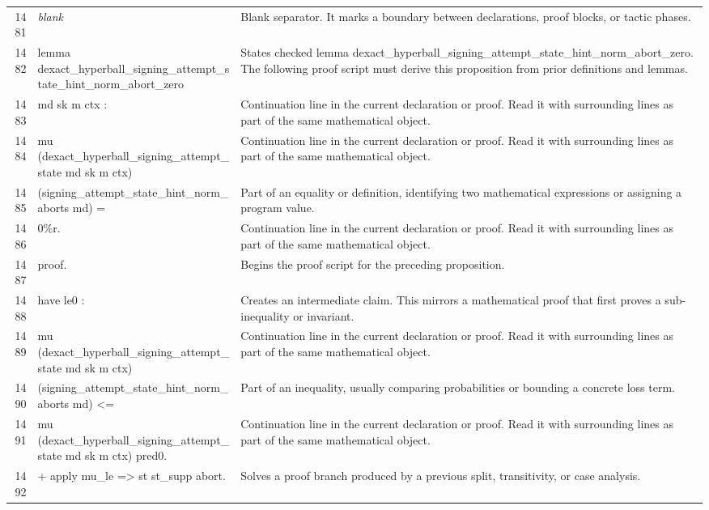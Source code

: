 \documentclass[10pt]{article}
\begin{document}
\begin{longtable}{r L{0.53\textwidth} L{0.37\textwidth}}
1481 & {\ttfamily\scriptsize \emph{blank}} & Blank separator.  It marks a boundary between declarations, proof blocks, or tactic phases. \\
1482 & {\ttfamily\scriptsize lemma dexact\_hyperball\_signing\_attempt\_state\_hint\_norm\_abort\_zero} & States checked lemma dexact\_hyperball\_signing\_attempt\_state\_hint\_norm\_abort\_zero.  The following proof script must derive this proposition from prior definitions and lemmas. \\
1483 & {\ttfamily\scriptsize   md sk m ctx :} & Continuation line in the current declaration or proof.  Read it with surrounding lines as part of the same mathematical object. \\
1484 & {\ttfamily\scriptsize   mu (dexact\_hyperball\_signing\_attempt\_state md sk m ctx)} & Continuation line in the current declaration or proof.  Read it with surrounding lines as part of the same mathematical object. \\
1485 & {\ttfamily\scriptsize     (signing\_attempt\_state\_hint\_norm\_aborts md) =} & Part of an equality or definition, identifying two mathematical expressions or assigning a program value. \\
1486 & {\ttfamily\scriptsize   0\%r.} & Continuation line in the current declaration or proof.  Read it with surrounding lines as part of the same mathematical object. \\
1487 & {\ttfamily\scriptsize proof.} & Begins the proof script for the preceding proposition. \\
1488 & {\ttfamily\scriptsize have le0 :} & Creates an intermediate claim.  This mirrors a mathematical proof that first proves a sub-inequality or invariant. \\
1489 & {\ttfamily\scriptsize   mu (dexact\_hyperball\_signing\_attempt\_state md sk m ctx)} & Continuation line in the current declaration or proof.  Read it with surrounding lines as part of the same mathematical object. \\
1490 & {\ttfamily\scriptsize     (signing\_attempt\_state\_hint\_norm\_aborts md) <=} & Part of an inequality, usually comparing probabilities or bounding a concrete loss term. \\
1491 & {\ttfamily\scriptsize   mu (dexact\_hyperball\_signing\_attempt\_state md sk m ctx) pred0.} & Continuation line in the current declaration or proof.  Read it with surrounding lines as part of the same mathematical object. \\
1492 & {\ttfamily\scriptsize + apply mu\_le => st st\_supp abort.} & Solves a proof branch produced by a previous split, transitivity, or case analysis. \\

\end{longtable}
\end{document}
